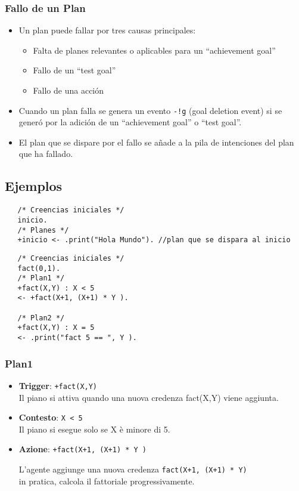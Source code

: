 \subsubsection{Fallo de un Plan}
\begin{itemize}
	\item Un plan puede fallar por tres causas principales:
   \begin{itemize}
   	\item Falta de planes relevantes o aplicables para un ``achievement goal''
	\item Fallo de un ``test goal''
	\item Fallo de una acción
   \end{itemize}
	\item Cuando un plan falla se genera un evento \lstinline|-!g| (goal deletion event) si se generó por la adición de un ``achievement goal'' o ``test goal''.
	\item El plan que se dispare por el fallo se añade a la pila de intenciones del plan que ha fallado.
\end{itemize}

\subsection{Ejemplos}


\lstset{language=Java}
\begin{lstlisting}
   /* Creencias iniciales */
   inicio.
   /* Planes */
   +inicio <- .print("Hola Mundo"). //plan que se dispara al inicio
\end{lstlisting}

\begin{lstlisting}
   /* Creencias iniciales */
   fact(0,1).
   /* Plan1 */
   +fact(X,Y) : X < 5
   <- +fact(X+1, (X+1) * Y ).

   /* Plan2 */
   +fact(X,Y) : X = 5
   <- .print("fact 5 == ", Y ).
\end{lstlisting}
\subsubsection*{Plan1}
\begin{itemize}
\item \textbf{Trigger}: \lstinline|+fact(X,Y)|\\
Il piano si attiva quando una nuova credenza fact(X,Y) viene aggiunta.

\item \textbf{Contesto}: \lstinline|X < 5|\\
Il piano si esegue solo se X è minore di 5.

\item \textbf{Azione}: \lstinline|+fact(X+1, (X+1) * Y )|

L'agente aggiunge una nuova credenza \lstinline|fact(X+1, (X+1) * Y)|\\
in pratica, calcola il fattoriale progressivamente.
\end{itemize}

